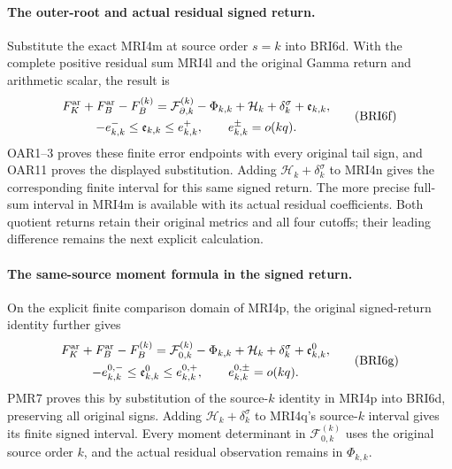 \documentclass[11pt,a4paper]{article}
\begin{document}
\paragraph{The outer-root and actual residual signed return.}
Substitute the exact MRI4m at source order $s=k$ into BRI6d.
With the complete positive residual sum MRI4l and the original
Gamma return and arithmetic scalar, the result is
\[
 \begin{gathered}
 F_K^{\rm ar}+F_B^{\rm ar}-F_B^{(k)}
   =\mathcal F_{\partial,k}^{(k)}-\Phi_{k,k}
        +\mathcal H_k+\delta_k^\sigma+\mathfrak e_{k,k},\\
 -e_{k,k}^-\le\mathfrak e_{k,k}\le e_{k,k}^+,\qquad
 e_{k,k}^\pm=o(kq).
 \end{gathered}\tag{BRI6f}
\]
OAR1--3 proves these finite error endpoints with every original
tail sign, and OAR11 proves the displayed substitution. Adding
$\mathcal H_k+\delta_k^\sigma$ to MRI4n gives the corresponding
finite interval for this same signed return. The more precise
full-sum interval in MRI4m is available with its actual residual
coefficients. Both quotient returns retain their original metrics
and all four cutoffs; their leading difference remains the next
explicit calculation.


\paragraph{The same-source moment formula in the signed return.}
On the explicit finite comparison domain of MRI4p, the original
signed-return identity further gives
\[
 \begin{gathered}
 F_K^{\rm ar}+F_B^{\rm ar}-F_B^{(k)}
   =\mathcal F_{0,k}^{(k)}-\Phi_{k,k}
       +\mathcal H_k+\delta_k^\sigma+\mathfrak e^0_{k,k},\\
 -e_{k,k}^{0,-}\le\mathfrak e^0_{k,k}\le e_{k,k}^{0,+},\qquad
 e_{k,k}^{0,\pm}=o(kq).
 \end{gathered}\tag{BRI6g}
\]
PMR7 proves this by substitution of the source-$k$ identity in
MRI4p into BRI6d, preserving all original signs. Adding
$\mathcal H_k+\delta_k^\sigma$ to MRI4q's source-$k$ interval
gives its finite signed interval. Every moment determinant in
$\mathcal F_{0,k}^{(k)}$ uses the original source order $k$,
and the actual residual observation remains in $\Phi_{k,k}$.
\end{document}
